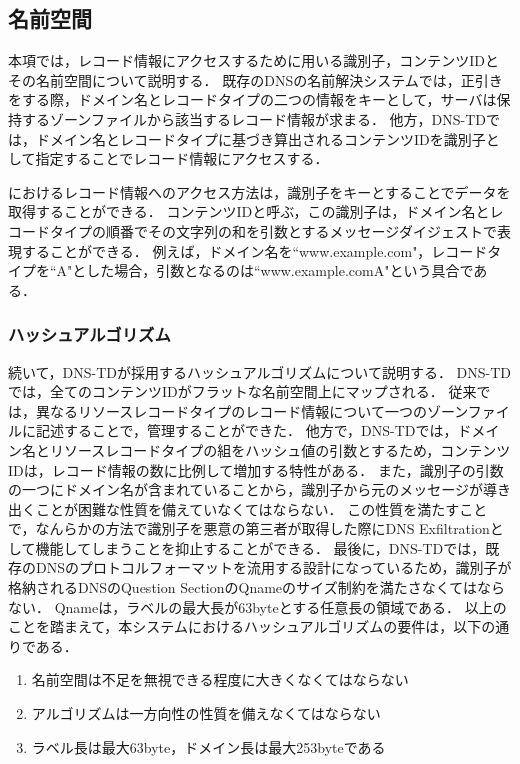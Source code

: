 \newpage
\subsection{名前空間}
本項では，レコード情報にアクセスするために用いる識別子，コンテンツIDとその名前空間について説明する．
既存のDNSの名前解決システムでは，正引きをする際，ドメイン名とレコードタイプの二つの情報をキーとして，サーバは保持するゾーンファイルから該当するレコード情報が求まる．
他方，DNS-TDでは，ドメイン名とレコードタイプに基づき算出されるコンテンツIDを識別子として指定することでレコード情報にアクセスする．

におけるレコード情報へのアクセス方法は，識別子をキーとすることでデータを取得することができる．
コンテンツIDと呼ぶ，この識別子は，ドメイン名とレコードタイプの順番でその文字列の和を引数とするメッセージダイジェストで表現することができる．
例えば，ドメイン名を``www.example.com"，レコードタイプを``A"とした場合，引数となるのは``www.example.comA"という具合である．

\subsubsection{ハッシュアルゴリズム}
続いて，DNS-TDが採用するハッシュアルゴリズムについて説明する．
DNS-TDでは，全てのコンテンツIDがフラットな名前空間上にマップされる．
従来では，異なるリソースレコードタイプのレコード情報について一つのゾーンファイルに記述することで，管理することができた．
他方で，DNS-TDでは，ドメイン名とリソースレコードタイプの組をハッシュ値の引数とするため，コンテンツIDは，レコード情報の数に比例して増加する特性がある．
また，識別子の引数の一つにドメイン名が含まれていることから，識別子から元のメッセージが導き出くことが困難な性質を備えていなくてはならない．
この性質を満たすことで，なんらかの方法で識別子を悪意の第三者が取得した際にDNS Exfiltrationとして機能してしまうことを抑止することができる．
最後に，DNS-TDでは，既存のDNSのプロトコルフォーマットを流用する設計になっているため，識別子が格納されるDNSのQuestion SectionのQnameのサイズ制約を満たさなくてはならない．
Qnameは，ラベルの最大長が63byteとする任意長の領域である．
以上のことを踏まえて，本システムにおけるハッシュアルゴリズムの要件は，以下の通りである．

\begin{enumerate}
 \item 名前空間は不足を無視できる程度に大きくなくてはならない
 \vspace{-3mm}
 \item アルゴリズムは一方向性の性質を備えなくてはならない
 \vspace{-3mm}
 \item ラベル長は最大63byte，ドメイン長は最大253byteである
 \vspace{-3mm}
\end{enumerate}

